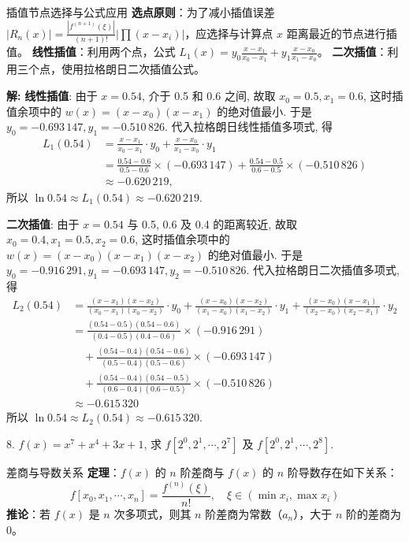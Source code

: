 \documentclass[a4paper,11pt]{ctexart}
\begin{document}
\begin{theorybox}{插值节点选择与公式应用}
\textbf{选点原则}：为了减小插值误差 $|R_n(x)| = \frac{|f^{(n+1)}(\xi)|}{(n+1)!}|\prod(x-x_i)|$，应选择与计算点 $x$ 距离最近的节点进行插值。
\textbf{线性插值}：利用两个点，公式 $L_1(x) = y_0 \frac{x-x_1}{x_0-x_1} + y_1 \frac{x-x_0}{x_1-x_0}$。
\textbf{二次插值}：利用三个点，使用拉格朗日二次插值公式。
\end{theorybox}

\textbf{解: }
\textbf{线性插值}: 由于 $x=0.54$, 介于 0.5 和 0.6 之间, 故取 $x_0=0.5, x_1=0.6$, 这时插值余项中的 $w(x) = (x-x_0)(x-x_1)$ 的绝对值最小. 于是 $y_0 = -0.693\,147, y_1 = -0.510\,826$. 代入拉格朗日线性插值多项式, 得
\begin{align*}
L_1(0.54) &= \frac{x-x_1}{x_0-x_1} \cdot y_0 + \frac{x-x_0}{x_1-x_0} \cdot y_1 \\
&= \frac{0.54-0.6}{0.5-0.6} \times (-0.693\,147) + \frac{0.54-0.5}{0.6-0.5} \times (-0.510\,826) \\
&\approx -0.620\,219,
\end{align*}
所以 $\ln 0.54 \approx L_1(0.54) \approx -0.620\,219$.

\textbf{二次插值}: 由于 $x=0.54$ 与 0.5, 0.6 及 0.4 的距离较近, 故取 $x_0=0.4, x_1=0.5, x_2=0.6$, 这时插值余项中的 $w(x)=(x-x_0)(x-x_1)(x-x_2)$ 的绝对值最小. 于是 $y_0=-0.916\,291, y_1=-0.693\,147, y_2=-0.510\,826$. 代入拉格朗日二次插值多项式, 得
\begin{align*}
L_2(0.54) &= \frac{(x-x_1)(x-x_2)}{(x_0-x_1)(x_0-x_2)} \cdot y_0 + \frac{(x-x_0)(x-x_2)}{(x_1-x_0)(x_1-x_2)} \cdot y_1 + \frac{(x-x_0)(x-x_1)}{(x_2-x_0)(x_2-x_1)} \cdot y_2 \\
&= \frac{(0.54-0.5)(0.54-0.6)}{(0.4-0.5)(0.4-0.6)} \times (-0.916\,291) \\
&\quad + \frac{(0.54-0.4)(0.54-0.6)}{(0.5-0.4)(0.5-0.6)} \times (-0.693\,147) \\
&\quad + \frac{(0.54-0.4)(0.54-0.5)}{(0.6-0.4)(0.6-0.5)} \times (-0.510\,826) \\
&\approx -0.615\,320
\end{align*}
所以 $\ln 0.54 \approx L_2(0.54) \approx -0.615\,320$.

\vspace{2em}

8. $f(x) = x^7 + x^4 + 3x + 1$, 求 $f[2^0, 2^1, \cdots, 2^7]$ 及 $f[2^0, 2^1, \cdots, 2^8]$.

\begin{theorybox}{差商与导数关系}
\textbf{定理}：$f(x)$ 的 $n$ 阶差商与 $f(x)$ 的 $n$ 阶导数存在如下关系：
\[ f[x_0, x_1, \cdots, x_n] = \frac{f^{(n)}(\xi)}{n!}, \quad \xi \in (\min x_i, \max x_i) \]
\textbf{推论}：若 $f(x)$ 是 $n$ 次多项式，则其 $n$ 阶差商为常数（$a_n$），大于 $n$ 阶的差商为 0。
\end{theorybox}
\end{document}
